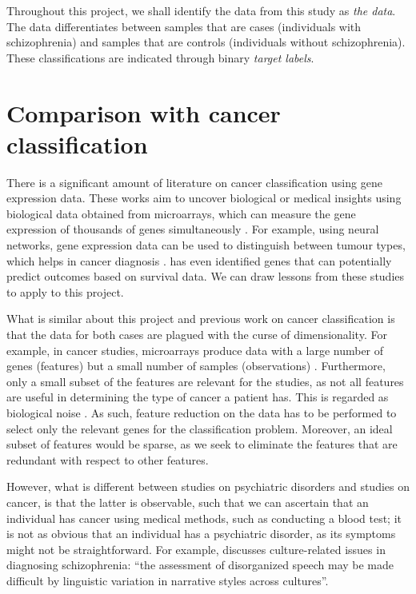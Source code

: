 \documentclass[12pt, twoside, a4paper]{report}
\begin{document}
Throughout this project, we shall identify the data from this study as \textit{the data}. The data differentiates between samples that are cases (individuals with schizophrenia) and samples that are controls (individuals without schizophrenia). These classifications are indicated through binary \textit{target labels}.


\section{Comparison with cancer classification} \label{bg:cancer}

There is a significant amount of literature on cancer classification using gene expression data. These works aim to uncover biological or medical insights using biological data obtained from microarrays, which can measure the gene expression of thousands of genes simultaneously \citep{RefWorks:79}. For example, using neural networks, gene expression data can be used to distinguish between tumour types, which helps in cancer diagnosis \citep{RefWorks:80, RefWorks:88}. \cite{RefWorks:199} has even identified genes that can potentially predict outcomes based on survival data. We can draw lessons from these studies to apply to this project.

What is similar about this project and previous work on cancer classification is that the data for both cases are plagued with the curse of dimensionality. For example, in cancer studies, microarrays produce data with a large number of genes (features) but a small number of samples (observations) \cite{RefWorks:88}. Furthermore, only a small subset of the features are relevant for the studies, as not all features are useful in determining the type of cancer a patient has. This is regarded as biological noise \cite{RefWorks:89}. As such, feature reduction on the data has to be performed to select only the relevant genes for the classification problem. Moreover, an ideal subset of features would be sparse, as we seek to eliminate the features that are redundant with respect to other features.

However, what is different between studies on psychiatric disorders and studies on cancer, is that the latter is observable, such that we can ascertain that an individual has cancer using medical methods, such as conducting a blood test; it is not as obvious that an individual has a psychiatric disorder, as its symptoms might not be straightforward. For example, \cite{RefWorks:114} discusses culture-related issues in diagnosing schizophrenia: ``the assessment of disorganized speech may be made difficult by linguistic variation in narrative styles across cultures''.
\end{document}
